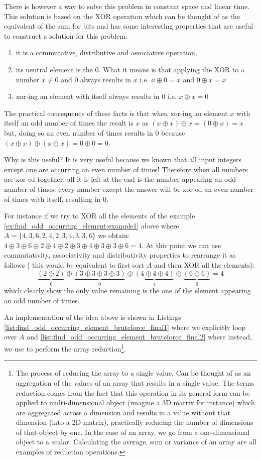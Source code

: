 There is however a way to solve this problem in constant space and linear time. 
This solution is based on the XOR operation which can be thought of as the equivalent of the sum for bits and has some interesting properties that are useful to construct a solution for this problem:
\begin{enumerate}
	\item it is a commutative, distributive and associative operation,
	\item its neutral element is the $0$. What it means is that applying the XOR to a number $x \neq 0$ and $0$  always results in $x$ i.e. $x \oplus 0 = x$ and $0 \oplus x = x$
	\item xor-ing an element with itself always results in 0 i.e. $x \oplus x = 0$
\end{enumerate}
The practical consequence of these facts is that when xor-ing an element $x$ with itself an odd number of times the result is $x$ as $(x \oplus x) \oplus x  = (0 \oplus x) = x$ but, doing so an even number of times results in $0$ because  $(x \oplus x) \oplus (x \oplus x) = 0 \oplus 0 = 0$.

Why is this useful? It is very useful because we known that all input integers except one are occurring an even number of times! Therefore when all numbers are xor-ed together, all it is left at the end is the number appearing an odd number of times: every number except the answer will be xor-ed an even number of times with itself, resulting in $0$. 

For instance if we try to XOR all the elements of the example  \ref{ex:find_odd_occurring_element:example1} above where $A=\{4,3,6,2,4,2,3,4,3,3,6\}$ we obtain: $4 \oplus 3 \oplus  6 \oplus 2 \oplus 4 \oplus 2 \oplus 3 \oplus 4 \oplus 3 \oplus 3 \oplus 6 = 4$. At this point we can use commutativity, associativity and distributivity properties to rearrange it as follows ( this would be equivalent to first sort $A$ and then XOR all the elements): 
$$\underbrace{(2 \oplus 2)}_{0} \oplus \underbrace{(3 \oplus 3 \oplus 3 \oplus 3)}_{0} \oplus \underbrace{(4 \oplus 4 \oplus 4)}_{4} \oplus \underbrace{(6 \oplus 6)}_{0} = 4$$ which clearly show the only value remaining is the one of the element appearing an odd number of times.


An implementation of the idea above is shown in Listings \ref{list:find_odd_occurring_element_bruteforce_final1} where we explicitly loop over $A$ and \ref{list:find_odd_occurring_element_bruteforce_final2} where instead, we use  to perform the array reduction\footnote{
	The process of reducing the array to a single value. Can be thought of as an aggregation of the values of an array that results in a single value. The terms reduction comes from the fact that this operation in its general form can be applied to multi-dimensional object (imagine a 3D matrix for instance)  which are aggregated across a dimension and results in a value without that dimension (into a 2D matrix), practically reducing the number of dimensions of that object by one. In the case of an array, we go from a one-dimensional object to a scalar. Calculating the average, sum or variance of an array are all examples of reduction operations.}.

